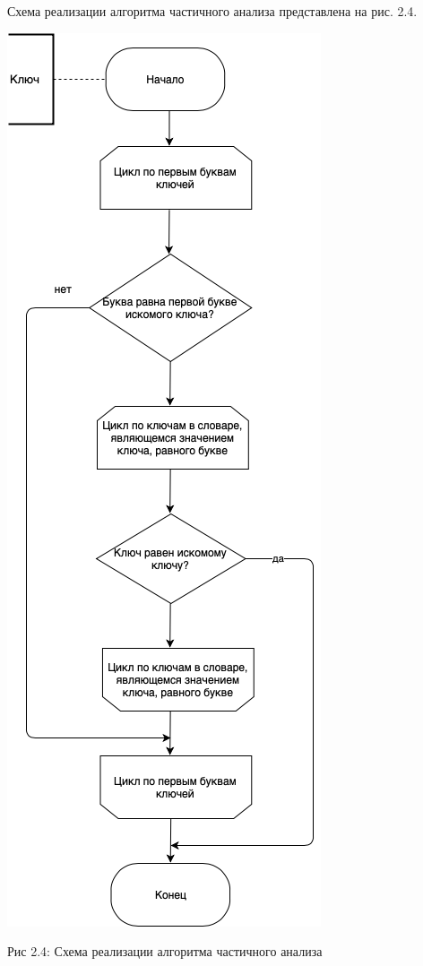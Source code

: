 \documentclass[12pt]{report}
\begin{document}
Схема реализации алгоритма частичного анализа представлена на рис. 2.4.

\begin{center}
		\includegraphics[scale=0.5]{schema/PartAnalysis.png}
		
			Рис 2.4: Схема реализации алгоритма частичного анализа
\end{center}
\end{document}
